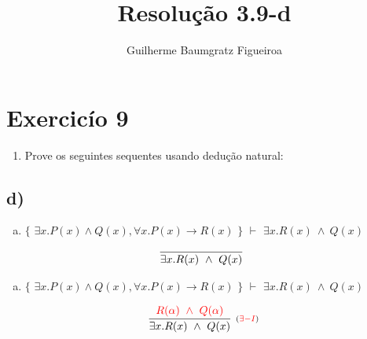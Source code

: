 \documentclass[aspectratio=43]{beamer}
\title[\sc{Resolu\c c\~ao}]{Resolu\c c\~ao 3.9-d}
\author[Guilherme Baumgratz Figueiroa]{Guilherme Baumgratz Figueiroa}
\institute[UFOP]{Universidade Federal de Ouro Preto} %
\date{}
\begin{document}
	
	\begin{frame}
		\titlepage
	\end{frame}
	
	\section{Exercic\'io 9}
	
	\begin{frame}%
    
    	\begin{enumerate}[1.]
			\item Prove os seguintes sequentes usando dedu\c c\~ao natural: \\
		\end{enumerate}
				
	\end{frame}
    \subsection{d)}
    
    \begin{frame}[fragile]
    
    	\begin{enumerate}[d)]
			\item $\{$ $\exists x.P(x)\land Q(x), \forall x.P(x)\to R(x)$ $\}$ $\vdash$ $\exists x.R(x)\ \land\ Q(x) $\\
		\end{enumerate}
        
        \vspace{80pt}
        
        \[
        \begin{array}{c}
		
        	\infer[_{}]
            	{\exists  x. R(x)\ \land\ Q(x)}
            	{}
        
		\end{array}
        \]
        
	\end{frame}
    
    \begin{frame}[fragile]
    
    	\begin{enumerate}[d)]
			\item $\{$ $\exists x.P(x)\land Q(x), \forall x.P(x)\to R(x)$ $\}$ $\vdash$ $\exists x.R(x)\ \land\ Q(x) $\\
		\end{enumerate}
        
        \vspace{80pt}
        
        \[
        \begin{array}{c}
		
        	\infer[_{(\textcolor{red}{\exists -I})}]
            	{\exists  x. R(x)\ \land\ Q(x)}
            	{\textcolor{red}{R(\alpha)\ \land\ Q(\alpha)}}
        
		\end{array}
        \]
        
	\end{frame}
    
\end{document}
